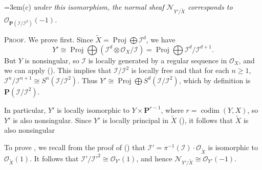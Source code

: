 {\noindent\hangindent=3em\hspace*{1.7em}\hypertarget{result-II-8.24-c}{}(c) \emph{under this isomorphism, the normal sheaf $\mathcal N_{Y'/\widetilde X}$ corresponds to $\mathcal O_{\mathbf P(\mathcal I/\mathcal I^2)}(-1)$.}

\smallskip
\noindent\textsc{Proof.} We prove  first. Since $\widetilde X=\operatorname{Proj}\bigoplus\mathcal I^d$, we have
\[
Y'\cong\operatorname{Proj}\bigoplus(\mathcal I^d\otimes\mathcal O_X/\mathcal I)=\operatorname{Proj}\bigoplus\mathcal I^d/\mathcal I^{d+1}.
\]
But $Y$ is nonsingular, so $\mathcal I$ is locally generated by a regular sequence in $\mathcal O_X$, and we can apply (). This implies that $\mathcal I/\mathcal I^2$ is locally free and that for each $n\ge1$, $\mathcal I^n/\mathcal I^{n+1}\cong S^n(\mathcal I/\mathcal I^2)$. Thus $Y'\cong\operatorname{Proj}\bigoplus S^d(\mathcal I/\mathcal I^2)$, which by definition is $\mathbf P(\mathcal I/\mathcal I^2)$.

In particular, $Y'$ is locally isomorphic to $Y\times\mathbf P^{r-1}$, where $r=\operatorname{codim}(Y,X)$, so $Y'$ is also nonsingular. Since $Y'$ is locally principal in $\widetilde X$ (), it follows that $\widetilde X$ is also nonsingular

To prove , we recall from the proof of () that $\mathcal I'=\pi^{-1}(\mathcal I)\cdot\mathcal O_{\widetilde X}$ is isomorphic to $\mathcal O_{\widetilde X}(1)$. It follows that $\mathcal I'/\mathcal I'^2\cong\mathcal O_{Y'}(1)$, and hence $\mathcal N_{Y'/\widetilde X}\cong\mathcal O_{Y'}(-1)$.}
